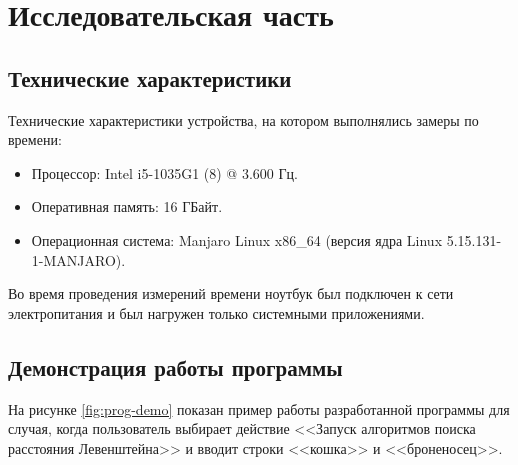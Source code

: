 \chapter{Исследовательская часть}

\section{Технические характеристики}

Технические характеристики устройства, на котором выполнялись замеры по времени:

\begin{itemize}
    \item Процессор: Intel i5-1035G1 (8) @ 3.600 Гц.
    \item Оперативная память: 16 ГБайт.
    \item Операционная система: Manjaro Linux x86\_64 (версия ядра Linux 5.15.131-1-MANJARO).
\end{itemize}

Во время проведения измерений времени ноутбук был подключен к сети электропитания и был нагружен только системными приложениями.

\section{Демонстрация работы программы}

На рисунке \ref{fig:prog-demo} показан пример работы разработанной программы для случая, когда пользователь выбирает действие <<Запуск алгоритмов поиска расстояния Левенштейна>> и вводит строки <<кошка>> и <<броненосец>>.

